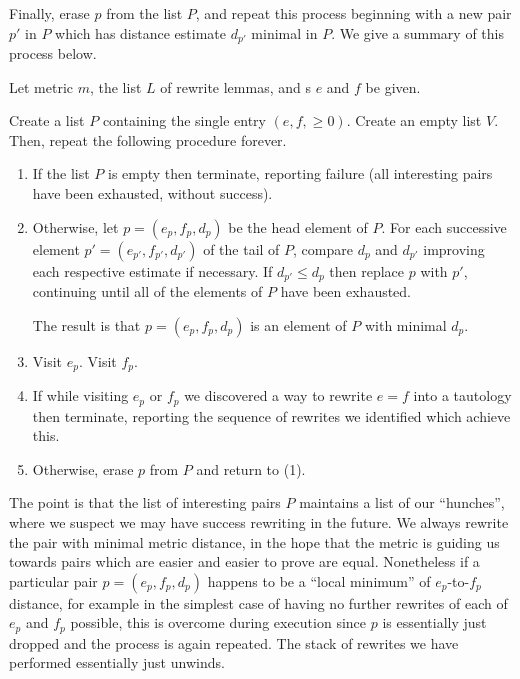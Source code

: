 \documentclass[12pt]{article}
\begin{document}
Finally, erase $p$ from the list $P$, and repeat this process beginning with a new pair $p'$ in $P$ which has distance estimate $d_{p'}$ minimal in $P$. We give a summary of this process below.

\begin{alg}
    \item Let metric $m$, the list $L$ of rewrite lemmas, and \expr{}s $e$ and $f$ be given.

    \item Create a list $P$ containing the single entry $(e, f, \geq 0)$. Create an empty list $V$. Then, repeat the following procedure forever.

    \begin{enumerate}[label={(\arabic*).}]
      \item If the list $P$ is empty then terminate, reporting failure (all interesting pairs have been exhausted, without success).

      \item Otherwise, let $p = (e_p, f_p, d_p)$ be the head element of $P$. For each successive element $p' = (e_{p'}, f_{p'}, d_{p'})$ of the tail of $P$, compare $d_{p}$ and $d_{p'}$ improving each respective estimate if necessary. If $d_{p'} \leq d_p$ then replace $p$ with $p'$, continuing until all of the elements of $P$ have been exhausted.

      The result is that $p = (e_p, f_p, d_p)$ is an element of $P$ with minimal $d_p$.

      \item Visit $e_p$. Visit $f_p$.

      \item If while visiting $e_p$ or $f_p$ we discovered a way to rewrite $e = f$ into a tautology then terminate, reporting the sequence of rewrites we identified which achieve this.

      \item Otherwise, erase $p$ from $P$ and return to (1).
  \end{enumerate}
\end{alg}

The point is that the list of interesting pairs $P$ maintains a list of our ``hunches'', where we suspect we may have success rewriting in the future. We always rewrite the pair with minimal metric distance, in the hope that the metric is guiding us towards pairs which are easier and easier to prove are equal. Nonetheless if a particular pair $p = (e_p, f_p, d_p)$ happens to be a ``local minimum'' of $e_p$-to-$f_p$ distance, for example in the simplest case of having no further rewrites of each of $e_p$ and $f_p$ possible, this is overcome during execution since $p$ is essentially just dropped and the process is again repeated. The stack of rewrites we have performed essentially just unwinds.
\end{document}
